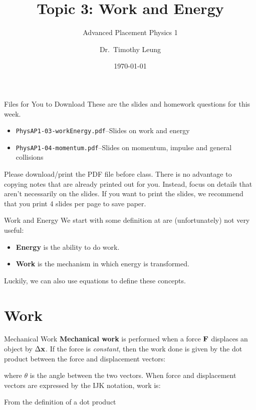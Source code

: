 \documentclass[12pt,compress,aspectratio=169]{beamer}
\title{Topic 3: Work and Energy}
\subtitle{Advanced Placement Physics 1}
\author[TML]{Dr.\ Timothy Leung}
\institute{Olympiads School}
\date{\today}
\newcommand{\mb}[1]{\ensuremath\mathbf{#1}}
\newcommand{\eq}[2]{\vspace{#1}{\Large\begin{displaymath}#2\end{displaymath}}}
\begin{document}
\begin{frame}
  \maketitle
\end{frame}

\begin{frame}{Files for You to Download}
  These are the slides and homework questions for this week.
  \begin{itemize}
  \item\texttt{PhysAP1-03-workEnergy.pdf}--Slides on work and energy
  \item\texttt{PhysAP1-04-momentum.pdf}--Slides on momentum, impulse and
    general collisions
  \end{itemize}
  Please download/print the PDF file before class. There is no advantage to
  copying notes that are already printed out for you. Instead, focus on details
  that aren't necessarily on the slides. If you want to print the slides, we
  recommend that you print 4 slides per page to save paper.
\end{frame}



\begin{frame}{Work and Energy}
  We start with some definition at are (unfortunately) not very useful:
  \begin{itemize}
    \item \textbf{Energy} is the ability to do work.
    \item \textbf{Work} is the mechanism in which energy is transformed.
  \end{itemize}
  Luckily, we can also use equations to define these concepts.
\end{frame}


\section{Work}

\begin{frame}{Mechanical Work}
  \textbf{Mechanical work} is performed when a force $\mb{F}$ displaces an
  object by $\Delta \mb{x}$. If the force is \emph{constant}, then the work
  done is given by the dot product between the force and displacement vectors:

  \eq{-.2in}{
    \boxed{W=\mb{F}\cdot\Delta\mb{x}}
    \quad\text{\normalsize or}\quad
    \boxed{W=|\mb{F}||\mb{\Delta x}|\cos\theta}
  }

  \vspace{-.15in}where $\theta$ is the angle between the two vectors. When
  force and displacement vectors are expressed by the IJK notation, work is:

  \eq{-.2in}{
    W=F_x\Delta x+F_y\Delta y+F_z\Delta z
  }

  From the definition of a dot product
\end{frame}
\end{document}
